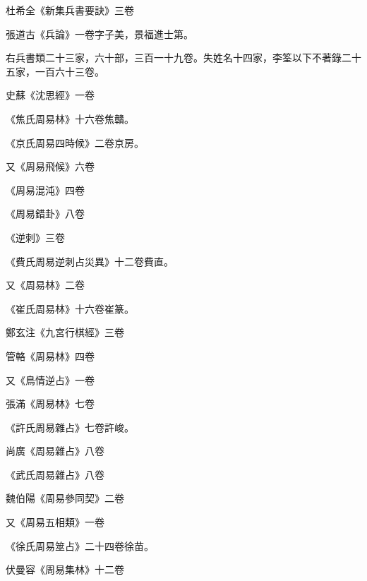 \begin{pinyinscope}
 杜希全《新集兵書要訣》三卷



 張道古《兵論》一卷字子美，景福進士第。



 右兵書類二十三家，六十部，三百一十九卷。失姓名十四家，李筌以下不著錄二十五家，一百六十三卷。



 史蘇《沈思經》一卷



 《焦氏周易林》十六卷焦贛。



 《京氏周易四時候》二卷京房。



 又《周易飛候》六卷



 《周易混沌》四卷



 《周易錯卦》八卷



 《逆刺》三卷



 《費氏周易逆刺占災異》十二卷費直。



 又《周易林》二卷



 《崔氏周易林》十六卷崔篆。



 鄭玄注《九宮行棋經》三卷



 管輅《周易林》四卷



 又《鳥情逆占》一卷



 張滿《周易林》七卷



 《許氏周易雜占》七卷許峻。



 尚廣《周易雜占》八卷



 《武氏周易雜占》八卷



 魏伯陽《周易參同契》二卷



 又《周易五相類》一卷



 《徐氏周易筮占》二十四卷徐苗。



 伏曼容《周易集林》十二卷




\end{pinyinscope}
